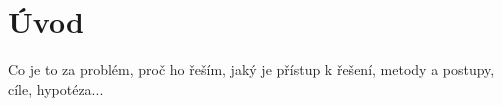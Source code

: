 \chapter*{Úvod}

Co je to za problém, proč ho řeším, jaký je přístup k řešení, metody a postupy, cíle, hypotéza...
